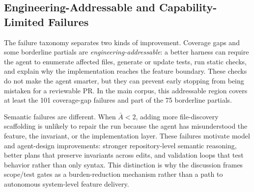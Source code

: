 
\subsection{Engineering-Addressable and Capability-Limited Failures}
\label{sec:addressable-failures}

The failure taxonomy separates two kinds of improvement. Coverage gaps and some borderline partials are \emph{engineering-addressable}: a better harness can require the agent to enumerate affected files, generate or update tests, run static checks, and explain why the implementation reaches the feature boundary. These checks do not make the agent smarter, but they can prevent early stopping from being mistaken for a reviewable PR. In the main corpus, this addressable region covers at least the 101 coverage-gap failures and part of the 75 borderline partials.

Semantic failures are different. When $\bar{A}<2$, adding more file-discovery scaffolding is unlikely to repair the run because the agent has misunderstood the feature, the invariant, or the implementation layer. These failures motivate model and agent-design improvements: stronger repository-level semantic reasoning, better plans that preserve invariants across edits, and validation loops that test behavior rather than only syntax. This distinction is why the discussion frames scope/test gates as a burden-reduction mechanism rather than a path to autonomous system-level feature delivery.
